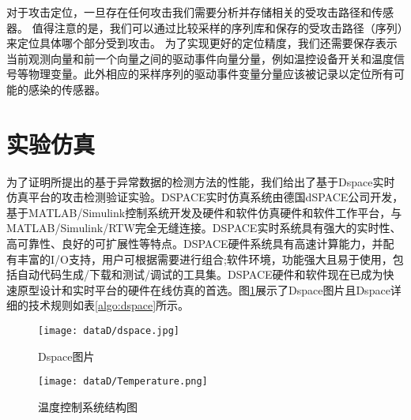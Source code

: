 对于攻击定位，一旦存在任何攻击我们需要分析并存储相关的受攻击路径和传感器。 值得注意的是，我们可以通过比较采样的序列库和保存的受攻击路径（序列）来定位具体哪个部分受到攻击。 为了实现更好的定位精度，我们还需要保存表示当前观测向量和前一个向量之间的驱动事件向量分量，例如温控设备开关和温度信号等物理变量。此外相应的采样序列的驱动事件变量分量应该被记录以定位所有可能的感染的传感器。

\section{实验仿真}
\label{sec:insertimage}


为了证明所提出的基于异常数据的检测方法的性能，我们给出了基于Dspace实时仿真平台的攻击检测验证实验。DSPACE实时仿真系统由德国dSPACE公司开发，基于MATLAB/Simulink控制系统开发及硬件和软件仿真硬件和软件工作平台，与MATLAB/Simulink/RTW完全无缝连接。DSPACE实时系统具有强大的实时性、高可靠性、良好的可扩展性等特点。DSPACE硬件系统具有高速计算能力，并配有丰富的I/O支持，用户可根据需要进行组合;软件环境，功能强大且易于使用，包括自动代码生成/下载和测试/调试的工具集。DSPACE硬件和软件现在已成为快速原型设计和实时平台的硬件在线仿真的首选。图\ref{fig112}展示了Dspace图片且Dspace详细的技术规则如表\ref{algo:dspace}所示。

	\begin{figure}[!htb]
		\centering
		\texttt{[image: dataD/dspace.jpg]}
		\caption{Dspace图片}
		\label{fig112}
	\end{figure}
	\begin{figure}[!htb]
	\centering
	\texttt{[image: dataD/Temperature.png]}
	\caption{温度控制系统结构图}
	\label{fig113}
\end{figure}



